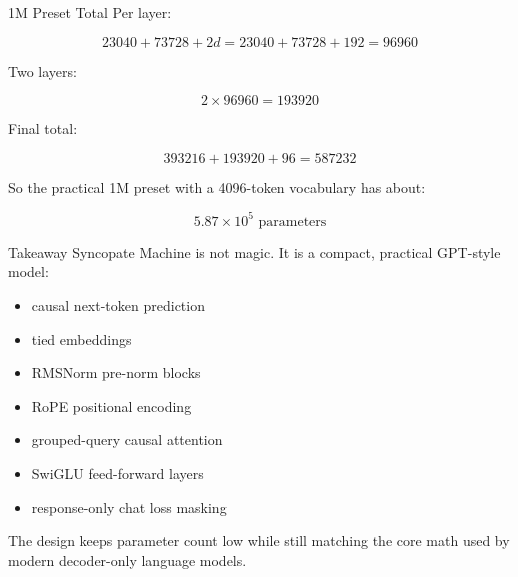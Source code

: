 \documentclass[aspectratio=169]{beamer}
\begin{document}
\begin{frame}{1M Preset Total}
  Per layer:

  \[
    23040 + 73728 + 2d
    =
    23040 + 73728 + 192
    =
    96960
  \]

  Two layers:

  \[
    2 \times 96960 = 193920
  \]

  Final total:

  \[
    393216 + 193920 + 96 = 587232
  \]

  \vspace{0.5em}

  So the practical 1M preset with a 4096-token vocabulary has about:

  \[
    5.87 \times 10^5 \text{ parameters}
  \]
\end{frame}

\begin{frame}{Takeaway}
  Syncopate Machine is not magic. It is a compact, practical GPT-style model:

  \begin{itemize}
    \item causal next-token prediction
    \item tied embeddings
    \item RMSNorm pre-norm blocks
    \item RoPE positional encoding
    \item grouped-query causal attention
    \item SwiGLU feed-forward layers
    \item response-only chat loss masking
  \end{itemize}

  \vspace{0.5em}

  The design keeps parameter count low while still matching the core math used by modern decoder-only language models.
\end{frame}
\end{document}
